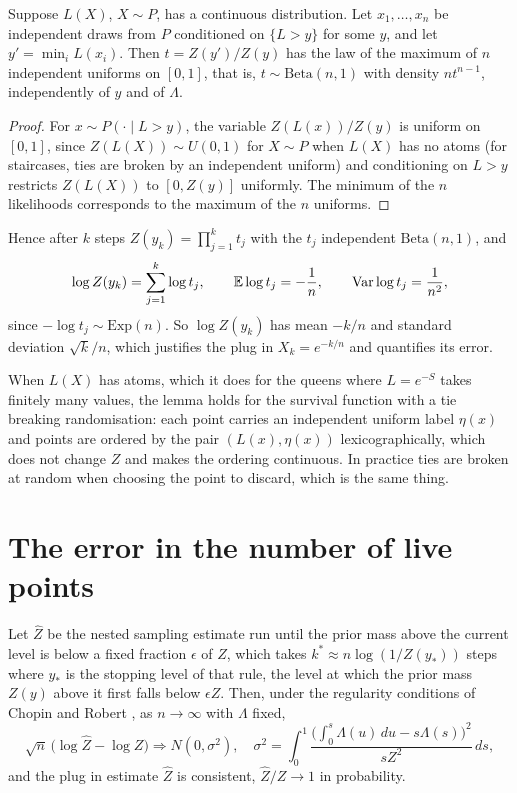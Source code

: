 \begin{lemma}
Suppose $L(X)$, $X \sim P$, has a continuous distribution. Let $x_1, \dots, x_n$ be independent draws from $P$ conditioned on $\{ L > y \}$ for some $y$, and let $y' = \min_i L(x_i)$. Then $t = Z(y') / Z(y)$ has the law of the maximum of $n$ independent uniforms on $[0, 1]$, that is, $t \sim \mathrm{Beta}(n, 1)$ with density $n t^{n-1}$, independently of $y$ and of $\Lambda$.
\end{lemma}

\begin{proof}
For $x \sim P(\cdot \mid L > y)$, the variable $Z(L(x)) / Z(y)$ is uniform on $[0, 1]$, since $Z(L(X)) \sim U(0, 1)$ for $X \sim P$ when $L(X)$ has no atoms (for staircases, ties are broken by an independent uniform) and conditioning on $L > y$ restricts $Z(L(X))$ to $[0, Z(y)]$ uniformly. The minimum of the $n$ likelihoods corresponds to the maximum of the $n$ uniforms.
\end{proof}

Hence after $k$ steps $Z(y_k) = \prod_{j=1}^{k} t_j$ with the $t_j$ independent $\mathrm{Beta}(n, 1)$, and
\[
\log Z(y_k) = \sum_{j=1}^{k} \log t_j , \qquad \mathbb{E} \log t_j = -\frac{1}{n} , \qquad \operatorname{Var} \log t_j = \frac{1}{n^2} ,
\]
since $-\log t_j \sim \mathrm{Exp}(n)$. So $\log Z(y_k)$ has mean $-k/n$ and standard deviation $\sqrt{k}/n$, which justifies the plug in $X_k = e^{-k/n}$ and quantifies its error.

When $L(X)$ has atoms, which it does for the queens where $L = e^{-S}$ takes finitely many values, the lemma holds for the survival function with a tie breaking randomisation: each point carries an independent uniform label $\eta(x)$ and points are ordered by the pair $(L(x), \eta(x))$ lexicographically, which does not change $Z$ and makes the ordering continuous. In practice ties are broken at random when choosing the point to discard, which is the same thing.

\section{The error in the number of live points}

\begin{theorem}
Let $\hat Z$ be the nested sampling estimate run until the prior mass above the current level is below a fixed fraction $\epsilon$ of $Z$, which takes $k^* \approx n \log(1 / Z(y_*))$ steps where $y_*$ is the stopping level of that rule, the level at which the prior mass $Z(y)$ above it first falls below $\epsilon Z$. Then, under the regularity conditions of Chopin and Robert \cite{ChopinRobert}, as $n \to \infty$ with $\Lambda$ fixed,
\[
\sqrt n \, \big( \log \hat Z - \log Z \big) \Rightarrow N(0, \sigma^2) , \quad \sigma^2 = \int_0^1 \frac{ \big( \int_0^s \Lambda(u) \, du - s \Lambda(s) \big)^2 }{s Z^2} \, ds ,
\]
and the plug in estimate $\hat Z$ is consistent, $\hat Z / Z \to 1$ in probability.
\end{theorem}

